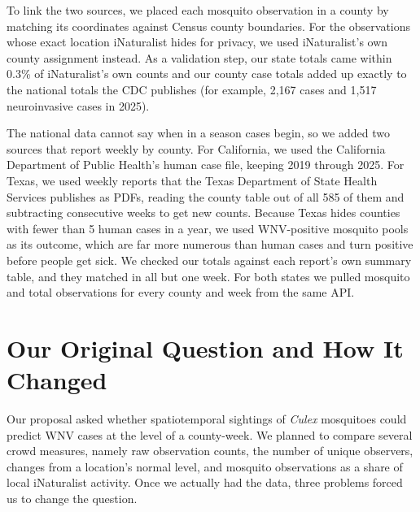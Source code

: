 \documentclass[11pt]{article}
\begin{document}
To link the two sources, we placed each mosquito observation in a county by matching its coordinates against Census county boundaries. For the observations whose exact location iNaturalist hides for privacy, we used iNaturalist's own county assignment instead. As a validation step, our state totals came within 0.3\% of iNaturalist's own counts and our county case totals added up exactly to the national totals the CDC publishes (for example, 2,167 cases and 1,517 neuroinvasive cases in 2025).

The national data cannot say when in a season cases begin, so we added two sources that report weekly by county. For California, we used the California Department of Public Health's human case file, keeping 2019 through 2025.\cite{cdph_wnv} For Texas, we used weekly reports that the Texas Department of State Health Services publishes as PDFs, reading the county table out of all 585 of them and subtracting consecutive weeks to get new counts.\cite{dshs_weekly} Because Texas hides counties with fewer than 5 human cases in a year, we used WNV-positive mosquito pools as its outcome, which are far more numerous than human cases and turn positive before people get sick. We checked our totals against each report's own summary table, and they matched in all but one week. For both states we pulled mosquito and total observations for every county and week from the same API.\cite{inat_api}

\section{Our Original Question and How It Changed}
Our proposal asked whether spatiotemporal sightings of \textit{Culex} mosquitoes could predict WNV cases at the level of a county-week. We planned to compare several crowd measures, namely raw observation counts, the number of unique observers, changes from a location's normal level, and mosquito observations as a share of local iNaturalist activity. Once we actually had the data, three problems forced us to change the question.
\end{document}
